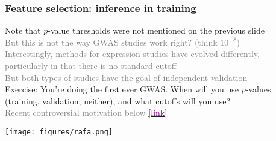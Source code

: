 \documentclass{beamer}
\newcommand{\si}[1]{\hspace{.5cm} \textcolor{gray} {#1}\\}
\newcommand{\sicont}[1]{\hspace{1cm} \textcolor{gray} {#1}\\}
\newcommand{\cref}[1]{\href{#1}{[\textcolor{purple}{link}]}}
\begin{document}
{\begin{frame}[t]
\frametitle{Feature selection: inference in training}
Note that $p$-value thresholds were not mentioned on the previous slide\\
\si{But this is not the way GWAS studies work right? (think $10^{-8}$)}
\si{Interestingly, methods for expression studies have evolved differently,}
\sicont{particularly in that there is no standard cutoff}
\si{But both types of studies have the goal of independent validation}
\vspace{.2cm}
Exercise: You're doing the first ever GWAS. When will you use $p$-values\\
\hspace{.5cm} (training, validation, neither), and what cutoffs will you use?\\
\si{Recent controversial motivation below \cref{https://simplystatistics.org/2017/06/20/lowering-the-gwas-threshold-would-save-millions-of-dollars/}}
\begin{center}
\texttt{[image: figures/rafa.png]}
\end{center}
\end{frame}

}
\end{document}
